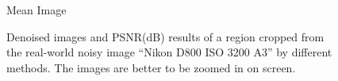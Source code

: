 \begin{figure}[t!]
{\begin{minipage}[t]{0.19\textwidth}
{\footnotesize Mean Image}
\end{minipage}
}\vspace{-3mm}
    \caption{Denoised images and PSNR(dB) results of a region cropped from the real-world noisy image ``Nikon D800 ISO 3200 A3'' \cite{crosschannel2016} by different methods. The images are better to be zoomed in on screen.}
    \label{fig3-15}
\end{figure}

\begin{figure}[t!]
    \centering
{}
\end{figure}
